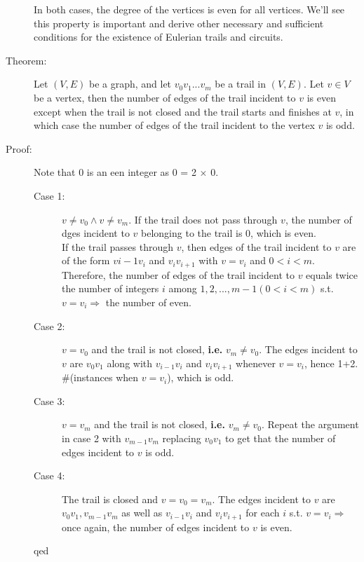 \documentclass[10pt]{article}
\begin{document}
\begin{description}
\begin{enumerate}
\begin{figure}[h!]
			\end{figure}
		\end{enumerate}
		In both cases, the degree of the vertices is even for all vertices. We'll see this property is important and derive other necessary and sufficient conditions for the existence of Eulerian trails and circuits.
		\item[Theorem:] Let $(V, E)$ be a graph, and let $v_0 v_1 ... v_m$ be a trail in $(V, E)$. Let $v \in V$ be a vertex, then the number of edges of the trail incident to $v$ is even except when the trail is not closed and the trail starts and finishes at $v$, in which case the number of edges of the trail incident to the vertex $v$ is odd.
		\item[Proof:] Note that 0 is an een integer as 0 = 2 $\times$ 0.
		\begin{description}
			\item[Case 1:] $v \neq v_0 \land v \neq v_m$. If the trail does not pass through $v$, the number of dges incident to $v$ belonging to the trail is 0, which is even. \\
			If the trail passes through $v$, then edges of the trail incident to $v$ are of the form $v{i-1} v_i$ and $v_i v_{i+1}$ with $v = v_i$ and $0 < i < m$. Therefore, the number of edges of the trail incident to $v$ equals twice the number of integers $i$ among $1, 2, ..., m-1 (0 < i < m)$ s.t. $v= v_i \Rightarrow$ the number of even.
			\item[Case 2:] $v = v_0$ and the trail is not closed, \textbf{i.e.} $v_m \neq v_0$. The edges incident to $v$ are $v_0 v_1$ along with $v_{i-1} v_i$ and $v_i v_{i+1}$ whenever $v=v_i$, hence 1+2. $\#$(instances when $v=v_i$), which is odd.
			\item[Case 3:] $v=v_m$ and the trail is not closed, \textbf{i.e.} $v_m \neq v_0$. Repeat the argument in case 2 with $v_{m-1} v_m$ replacing $v_0 v_1$ to get that the number of edges incident to $v$ is odd.
			\item[Case 4:] The trail is closed and $v = v_0 = v_m$. The edges incident to $v$ are $v_0 v_1, v_{m-1} v_m$ as well as $v_{i-1} v_i$ and $v_i v_{i+1}$ for each $i$ s.t. $v=v_i \Rightarrow$ once again, the number of edges incident to $v$ is even.
			\item[qed]
		\end{description}

\end{description}
\end{document}
